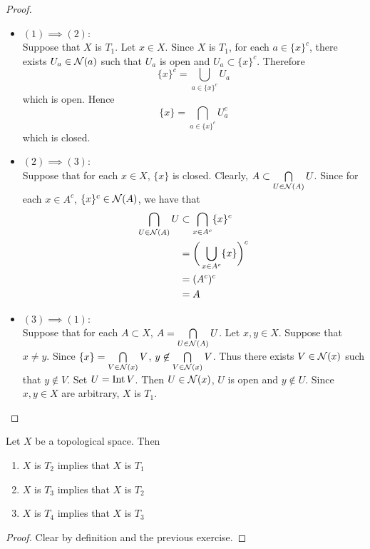 \documentclass{book}
\begin{document}
	\begin{proof}\
		\begin{itemize}
			\item $(1) \implies (2)$: \\
			Suppose that $X$ is $T_1$. Let $x \in X$. Since $X$ is $T_1$, for each $a \in \{x\}^c$, there exists $U_{a} \in \mathcal{N}(a)$ such that $U_a$ is open and $U_{a} \subset \{x\}^c$. Therefore 
			$$\{x\}^c = \bigcup_{a \in \{x\}^c} U_a$$ 
			which is open. Hence 
			$$\{x\} = \bigcap_{a \in \{x\}^c} U_a^c$$
			which is closed. \\
			\item $(2) \implies (3)$: \\
			Suppose that for each $x \in X$, $\{x\}$ is closed. Clearly, $A \subset \bigcap\limits_{U \in \mathcal{N}(A)} U$. Since for each $x \in A^c$, $\{x\}^c \in \mathcal{N}(A)$, we have that 
			\begin{align*}
				\bigcap_{U \in \mathcal{N}(A)} U
				& \subset \bigcap_{x \in A^c} \{x\}^c \\
				& = \bigg( \bigcup_{x \in A^c} \{x\} \bigg)^c \\
				& = (A^c)^c \\
				& = A
			\end{align*}
			\item $(3) \implies (1)$: \\
			Suppose that for each $A \subset X$, $A = \bigcap\limits_{U \in \mathcal{N}(A)} U$. Let $x, y \in X$. Suppose that $x \neq y$. Since $\{x\} = \bigcap\limits_{V \in \mathcal{N}(x)} V$, $y \not \in  \bigcap\limits_{V \in \mathcal{N}(x)} V$. Thus there exists $V \in \mathcal{N}(x)$ such that $y \not \in V$. Set $U = \operatorname{Int} V$. Then $U \in \mathcal{N}(x)$, $U$ is open and $y \not \in U$. Since $x, y \in X$ are arbitrary, $X$ is $T_1$.
		\end{itemize}
	\end{proof}

	\begin{ex}
		Let $X$ be a topological space. Then 
		\begin{enumerate}
			\item $X$ is $T_2$ implies that $X$ is $T_1$
			\item $X$ is $T_3$ implies that $X$ is $T_2$ 
			\item $X$ is $T_4$ implies that $X$ is $T_3$ 
		\end{enumerate}
	\end{ex}
	
	\begin{proof}
		Clear by definition and the previous exercise.
	\end{proof}
\end{document}
